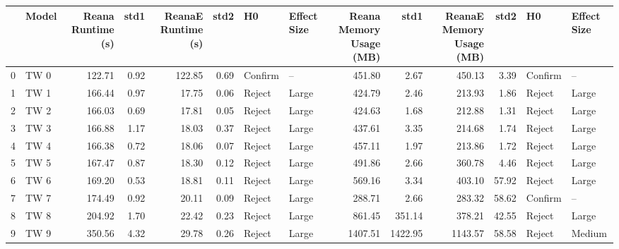 \begin{tabular}{llrrrrllrrrrll}
\toprule
{} & Model &  Reana Runtime (s) &  std1 &  ReanaE Runtime (s) &  std2 &       H0 & Effect Size &  Reana Memory Usage (MB) &     std1 &  ReanaE Memory Usage (MB) &   std2 &       H0 & Effect Size \\
\midrule
0 &  TW 0 &             122.71 &  0.92 &              122.85 &  0.69 &  Confirm &          -- &                   451.80 &     2.67 &                    450.13 &   3.39 &  Confirm &          -- \\
1 &  TW 1 &             166.44 &  0.97 &               17.75 &  0.06 &   Reject &       Large &                   424.79 &     2.46 &                    213.93 &   1.86 &   Reject &       Large \\
2 &  TW 2 &             166.03 &  0.69 &               17.81 &  0.05 &   Reject &       Large &                   424.63 &     1.68 &                    212.88 &   1.31 &   Reject &       Large \\
3 &  TW 3 &             166.88 &  1.17 &               18.03 &  0.37 &   Reject &       Large &                   437.61 &     3.35 &                    214.68 &   1.74 &   Reject &       Large \\
4 &  TW 4 &             166.38 &  0.72 &               18.06 &  0.07 &   Reject &       Large &                   457.11 &     1.97 &                    213.86 &   1.72 &   Reject &       Large \\
5 &  TW 5 &             167.47 &  0.87 &               18.30 &  0.12 &   Reject &       Large &                   491.86 &     2.66 &                    360.78 &   4.46 &   Reject &       Large \\
6 &  TW 6 &             169.20 &  0.53 &               18.81 &  0.11 &   Reject &       Large &                   569.16 &     3.34 &                    403.10 &  57.92 &   Reject &       Large \\
7 &  TW 7 &             174.49 &  0.92 &               20.11 &  0.09 &   Reject &       Large &                   288.71 &     2.66 &                    283.32 &  58.62 &  Confirm &          -- \\
8 &  TW 8 &             204.92 &  1.70 &               22.42 &  0.23 &   Reject &       Large &                   861.45 &   351.14 &                    378.21 &  42.55 &   Reject &       Large \\
9 &  TW 9 &             350.56 &  4.32 &               29.78 &  0.26 &   Reject &       Large &                  1407.51 &  1422.95 &                   1143.57 &  58.58 &   Reject &      Medium \\
\bottomrule
\end{tabular}
